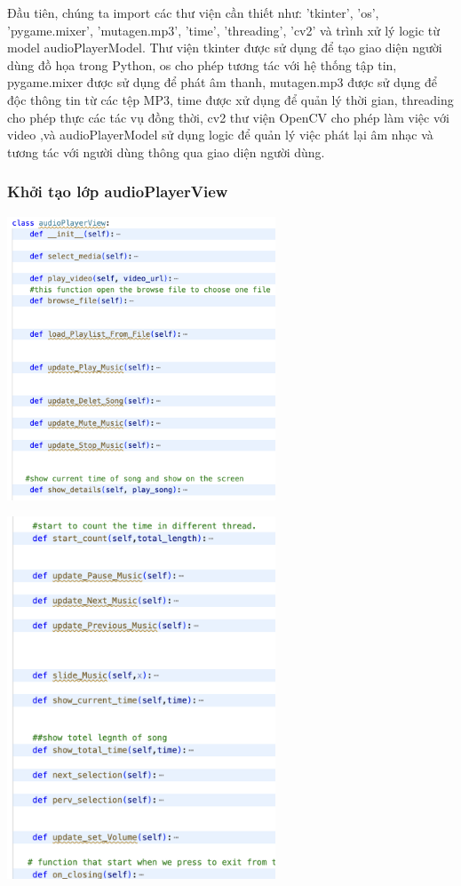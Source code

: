 \documentclass[a4paper]{article}
\begin{document}
\hspace*{0.5} Đầu tiên, chúng ta import các thư viện cần thiết như: 'tkinter', 'os', 'pygame.mixer', 'mutagen.mp3', 'time', 'threading', 'cv2' và trình xử lý logic từ model audioPlayerModel. Thư viện tkinter được sử dụng để tạo giao diện người dùng đồ họa trong Python, os cho phép tương tác với hệ thống tập tin, pygame.mixer được sử dụng để phát âm thanh, mutagen.mp3 được sử dụng để độc thông tin từ các tệp MP3, time được xử dụng để quản lý thời gian, threading cho phép thực các  tác vụ đồng thời, cv2 thư viện OpenCV cho phép làm việc với video ,và audioPlayerModel sử dụng logic để quản lý việc phát lại âm nhạc và tương tác với người dùng thông qua giao diện người dùng.

\subsubsection{Khởi tạo lớp audioPlayerView}
\begin{center}
\includegraphics[width=80mm]{template_SGU 2/khoitao_View1.png}
\end{center}
\begin{center}
\includegraphics[width=80mm]{template_SGU 2/khoitao_View2.png}
\end{center}
\end{document}
